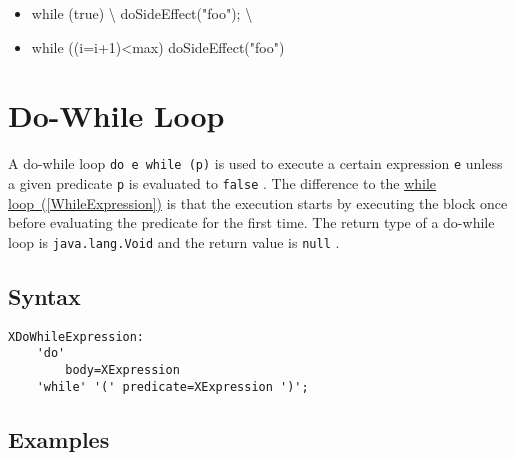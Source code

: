 \documentclass[a4paper,10pt]{scrreprt}
\newlength{\itemindentlen}
\begin{document}
\setlength{\itemindentlen}{\textwidth}
\begin{itemize}
\addtolength{\itemindentlen}{-2em}

\item \begin{minipage}[t]{\itemindentlen}

	while (true) \textbackslash{}{
		doSideEffect("foo");
	\textbackslash{}}
	
\end{minipage}

\item \begin{minipage}[t]{\itemindentlen}

	while ((i=i+1)<max) doSideEffect("foo")
	
\end{minipage}

\end{itemize}
\addtolength{\itemindentlen}{2em}







\section{Do-While Loop\label{DoWhileExpression}}
A do-while loop \lstinline{do e while (p)}
 is used to execute a certain expression \lstinline{e}
 unless a given predicate \lstinline{p}
 is evaluated to \lstinline{false}
.
The difference to the 
\hyperref[WhileExpression]{while loop~(\ref*{WhileExpression})} is that the execution starts by executing the block once before evaluating the predicate for the first time.
The return type of a do-while loop is \lstinline{java.lang.Void}
 and the return value is \lstinline{null}
.

\subsection{Syntax}
\begin{lstlisting}
XDoWhileExpression:
	'do'
		body=XExpression
	'while' '(' predicate=XExpression ')';

\end{lstlisting}
 




\subsection{Examples}
\end{document}
